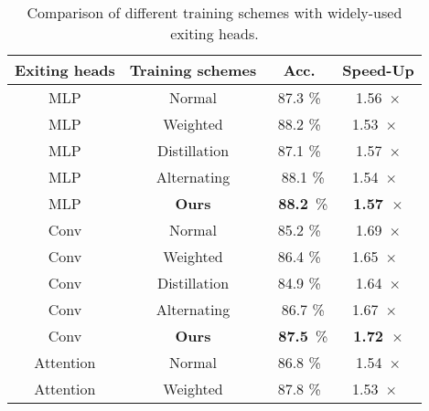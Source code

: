   \begin{table}[t]
    \centering
    \setlength{\extrarowheight}{0pt}
    \addtolength{\extrarowheight}{\aboverulesep}
    \addtolength{\extrarowheight}{\belowrulesep}
    \setlength{\aboverulesep}{0pt}
    \setlength{\belowrulesep}{0pt}
    \caption{Comparison of different training schemes with widely-used exiting heads.}
    \label{tb:train_head}
    \vspace{-6pt}
    \begin{tabular}{cccc} 
    \toprule
    \textbf{Exiting heads}                      & \textbf{Training schemes} & \textbf{Acc.}     & \textbf{Speed-Up}       \\ 
    \hline
    MLP                                         & Normal                    & 87.3 \%           & 1.56~$\times$           \\
    MLP                                         & Weighted                  & 88.2 \%           & 1.53~$\times$~          \\
    MLP                                         & Distillation              & 87.1 \%           & 1.57~$\times$           \\
    MLP                                         & Alternating               & ~88.1 \%          & 1.54~$\times$~          \\
    \rowcolor[rgb]{0.949,0.949,0.949} MLP       & \textbf{Ours}             & ~\textbf{88.2}~\% & \textbf{1.57~}$\times$  \\ 
    \hline
    Conv                                        & Normal                    & 85.2 \%           & 1.69~$\times$           \\
    Conv                                        & Weighted                  & 86.4 \%           & 1.65~$\times$~          \\
    Conv                                        & Distillation              & 84.9 \%           & 1.64~$\times$           \\
    Conv                                        & Alternating               & ~86.7 \%          & 1.67~$\times$~          \\
    \rowcolor[rgb]{0.949,0.949,0.949} Conv      & \textbf{Ours}             & ~\textbf{87.5}~\% & \textbf{1.72~}$\times$  \\ 
    \hline
    Attention                                   & Normal                    & 86.8 \%           & 1.54~$\times$           \\
    Attention                                   & Weighted                  & 87.8 \%           & 1.53~$\times$~          \\

\end{tabular}
\end{table}
